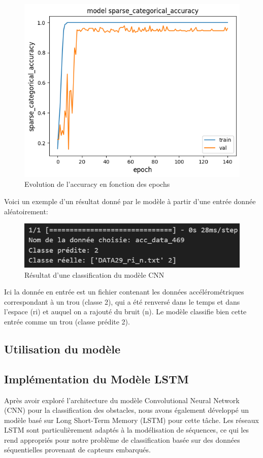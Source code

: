 \begin{figure}[H]
    \centering
    \includegraphics[width=0.5\linewidth]{output.png}
    \caption{Evolution de l'accuracy en fonction des epochs}
    \label{plot_accuracy}
\end{figure}

Voici un exemple d'un résultat donné par le modèle à partir d'une entrée donnée aléatoirement: 
\begin{figure}[H]
    \centering
    \includegraphics[width=0.5\linewidth]{rescnn.png}
    \caption{Résultat d'une classification du modèle CNN}
    \label{rescnn}
\end{figure}
Ici la donnée en entrée est un fichier contenant les données accélérométriques correspondant à un trou (classe 2), qui a été renversé dans le temps et dans l'espace (ri) et auquel on a rajouté du bruit (n). Le modèle classifie bien cette entrée comme un trou (classe prédite 2).

\subsection{Utilisation du modèle}


\subsection{Implémentation du Modèle LSTM}
Après avoir exploré l'architecture du modèle Convolutional Neural Network (CNN) pour la classification des obstacles, nous avons également développé un modèle basé sur Long Short-Term Memory (LSTM) pour cette tâche. Les réseaux LSTM sont particulièrement adaptés à la modélisation de séquences, ce qui les rend appropriés pour notre problème de classification basée sur des données séquentielles provenant de capteurs embarqués.

